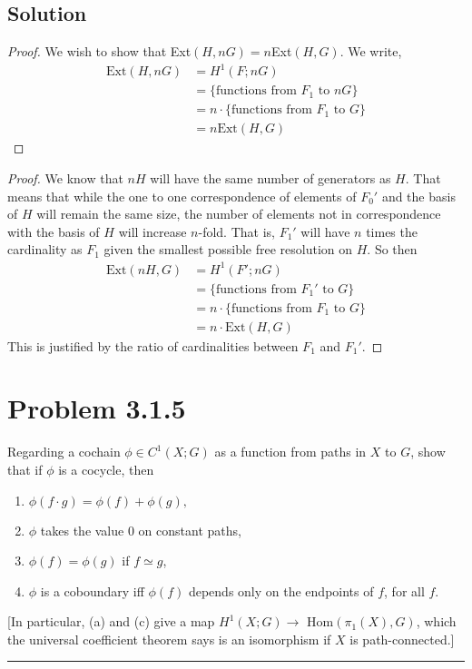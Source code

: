 \documentclass{article}
\theoremstyle{definition}
\begin{document}
\subsection*{Solution}
\begin{proof}
    We wish to show that Ext$(H,nG) = n$Ext$(H,G)$.
    We write,
    \begin{align*}
        \text{Ext}(H,nG) &= H^1(F;nG) \\
        &= \{\text{functions from $F_1$ to $nG$}\} \\
        &= n \cdot \{\text{functions from $F_1$ to $G$}\} \\
        &= n\text{Ext}(H,G)
    \end{align*}
\end{proof}
\begin{proof}
    We know that $nH$ will have the same number of generators 
    as $H$. That means that while the one to one correspondence 
    of elements of $F_0'$ and the basis of $H$ will remain the same 
    size, the number of elements not in correspondence with the basis 
    of $H$ will increase $n$-fold. That is, $F_1'$ will have $n$ times the
    cardinality as $F_1$ given the smallest possible free resolution on $H$.
    So then 
    \begin{align*}
        \text{Ext}(nH,G) &= H^1(F';nG) \\
        &= \{\text{functions from $F_1'$ to $G$}\} \\
        &= n \cdot \{\text{functions from $F_1$ to $G$}\} \\
        &= n \cdot \text{Ext}(H,G)
    \end{align*}
    This is justified by the ratio of cardinalities between $F_1$ and $F_1'$.
\end{proof}

\section*{Problem 3.1.5}
Regarding a cochain $\phi \in C^1(X;G)$ as a function from paths in $X$ to 
$G$, show that if $\phi$ is a cocycle, then 
\begin{enumerate}
    \item $\phi(f \cdot g) = \phi(f) + \phi(g),$
    \item $\phi$ takes the value 0 on constant paths,
    \item $\phi(f) = \phi(g)$ if $f \simeq g$,
    \item $\phi$ is a coboundary iff $\phi(f)$ depends only on the endpoints of $f$, for all $f$. 
\end{enumerate}
[In particular, (a) and (c) give a map $H^1(X;G) \to$ Hom$(\pi_1(X),G)$,
which the universal coefficient theorem says is an isomorphism if $X$ 
is path-connected.]
\\
\par\noindent\rule{\textwidth}{0.4pt}
\end{document}
